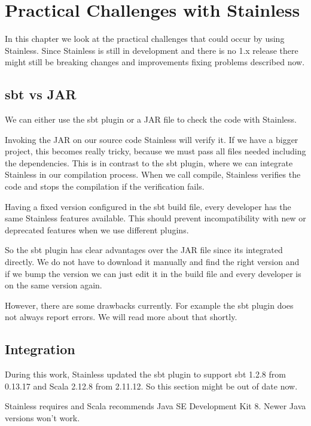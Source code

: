 \chapter{Practical Challenges with Stainless}
\label{chap:appendix_arb}

In this chapter we look at the practical challenges that could occur by using Stainless.
Since Stainless is still in development and there is no 1.x release there might still be breaking changes and improvements fixing problems described now.


\section{sbt vs JAR}

We can either use the sbt plugin or a JAR file to check the code with Stainless.

Invoking the JAR on our source code Stainless will verify it.
If we have a bigger project, this becomes really tricky, because we must pass all files needed including the dependencies.
This is in contrast to the sbt plugin, where we can integrate Stainless in our compilation process.
When we call compile, Stainless verifies the code and stops the compilation if the verification fails.

Having a fixed version configured in the sbt build file, every developer has the same Stainless features available.
This should prevent incompatibility with new or deprecated features when we use different plugins.

So the sbt plugin has clear advantages over the JAR file since its integrated directly.
We do not have to download it manually and find the right version and if we bump the version we can just edit it in the build file and every developer is on the same version again.

However, there are some drawbacks currently.
For example the sbt plugin does not always report errors.
We will read more about that shortly.


\section{Integration}

During this work, Stainless updated the sbt plugin to support sbt 1.2.8 from 0.13.17 and Scala 2.12.8 from 2.11.12.
So this section might be out of date now.

Stainless requires and Scala recommends Java SE Development Kit 8.
Newer Java versions won't work.

